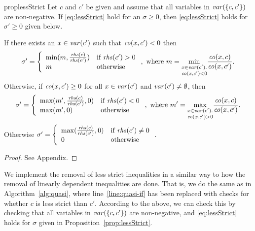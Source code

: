 \begin{restatable}{prop}{lessStrict}\label{prop:lessStrict}
Let $c$ and $c'$ be given and assume that all variables in $\mathit{var}(\{c,c'\})$ are non-negative. If \eqref{eq:lessStrict} hold for an $\sigma\geq 0$, then \eqref{eq:lessStrict} holds for $\sigma'\geq 0$ given below.

If there exists an $x\in\mathit{var}(c')$ such that $\mathit{co}(x,c')<0$ then
\[
\sigma' = \left\{\begin{array}{ll}
				\min( m, \frac{\mathit{rhs}(c)}{\mathit{rhs}(c')})& \text{if } \mathit{rhs}(c') > 0\\
				m 										& \text{otherwise}
				\end{array}\right.,
\text{ where }
m = {\min_{\substack{x\in \mathit{var}(c').\\ \mathit{co}(x,c')<0}}}\frac{\mathit{co}(x,c)}{\mathit{co}(x,c')}.
\]
Otherwise, if $\mathit{co}(x,c')\geq 0$ for all $x\in\mathit{var}(c')$ and $\mathit{var}(c')\neq \emptyset$, then  	
\[
\sigma' = \left\{\begin{array}{ll}
					\max(m', \frac{\mathit{rhs}(c)}{\mathit{rhs}(c')},0)&\text{if } \mathit{rhs}(c') < 0\\
					\max(m',0)							& \text{otherwise}\end{array}\right.,
\text{ where }
m' = {\max_{\substack{x\in \mathit{var}(c').\\ \mathit{co}(x,c')>0}}}\frac{\mathit{co}(x,c)}{\mathit{co}(x,c')}.
\]
Otherwise
$\sigma' = \left\{\begin{array}{ll}\max(\frac{\mathit{rhs}(c)}{\mathit{rhs}(c')},0)& \text{if } \mathit{rhs}(c')\neq 0\\0&\text{otherwise}\end{array}\right.$.
\end{restatable}
\begin{proof}
See Appendix.
\end{proof}	

We implement the removal of less strict inequalities in a similar way to how the removal of linearly dependent inequalities are done. That is, we do the same as in Algorithm~\ref{alg:quasi}, where line~\ref{line:quasi-if} has been replaced with checks for whether $c$ is less strict than $c'$. According to the above, we can check this by checking that all variables in $\mathit{var}(\{c,c'\})$ are non-negative, and \eqref{eq:lessStrict} holds for $\sigma$ given in Proposition~\ref{prop:lessStrict}.  
%
